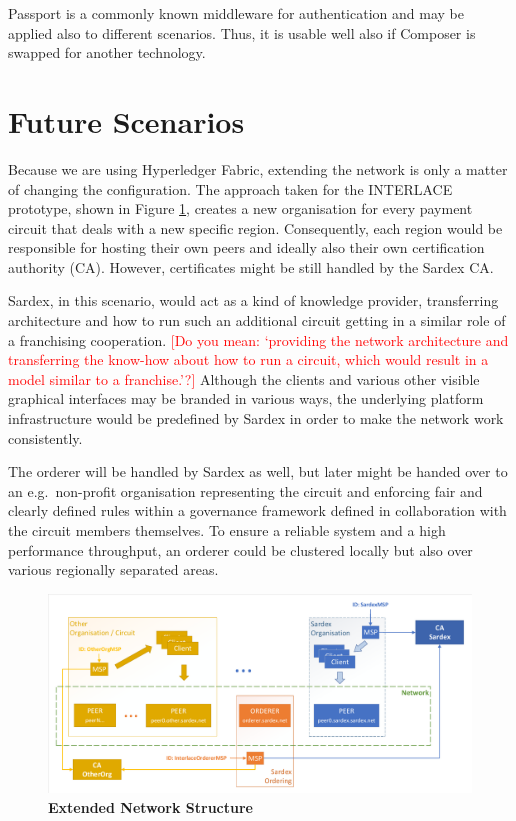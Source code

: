 Passport is a commonly known middleware for authentication and may be applied also to different scenarios. Thus, it is usable well also if Composer is swapped for another technology.

\section{Future Scenarios}
\label{sec:future-scene}

Because we are using Hyperledger Fabric, extending the network is only a matter of changing the configuration. The approach taken for the INTERLACE prototype, shown in Figure \ref{fig:prototype-net-ext}, creates a new organisation for every payment circuit that deals with a new specific region. Consequently, each region would be responsible for hosting their own peers and ideally also their own certification authority (CA). However, certificates might be still handled by the Sardex CA. 

Sardex, in this scenario, would act as a kind of knowledge provider, transferring architecture and how to run such an additional circuit getting in a similar role of a franchising cooperation. \textcolor{red}{[Do you mean: `providing the network architecture and transferring the know-how about how to run a circuit, which would result in a model similar to a franchise.'?]} Although the clients and various other visible graphical interfaces may be branded in various ways, the underlying platform infrastructure would be predefined by Sardex in order to make the network work consistently.

The orderer will be handled by Sardex as well, but later might be handed over to an e.g.\ non-profit organisation representing the circuit and enforcing fair and clearly defined rules within a governance framework defined in collaboration with the circuit members themselves. To ensure a reliable system and a high performance throughput, an orderer could be clustered locally but also over various regionally separated areas.

\begin{figure}[htbp]
  \centering
  \includegraphics[width=1.0\textwidth, clip, trim=1mm 1mm 1mm 1mm]{Figures/extended-network}
  \caption{\bf\small Extended Network Structure}
  \label{fig:prototype-net-ext}
\end{figure}

